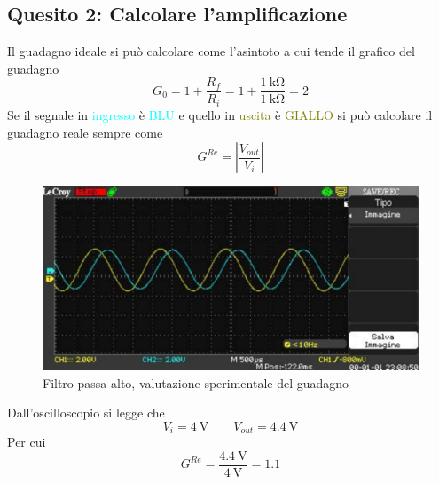 \documentclass[a4paper, 12pt, twoside]{report}
\begin{document}
	\newpage
	
	\subsection{Quesito 2: Calcolare l'amplificazione}
	Il guadagno ideale si può calcolare come l'asintoto a cui tende il grafico del guadagno
	\[G_0 = 1 + \dfrac{R_f}{R_i} = 1 + \dfrac{\SI{1}{\kilo\ohm}}{\SI{1}{\kilo\ohm}} = 2\]	
	Se il segnale in \textcolor{cyan}{ingresso} è \textcolor{cyan}{BLU} e quello in \textcolor{olive}{uscita} è \textcolor{olive}{GIALLO} si può calcolare il guadagno reale sempre come
	\[G^{Re} = \left|\dfrac{V_{out}}{V_i}\right| \] 
	
\begin{figure}[H]
	\centering
	\includegraphics[width=0.7\linewidth]{imag/WA000018}
	\caption{Filtro passa-alto, valutazione sperimentale del guadagno}
	\label{fig:wa000018}
\end{figure}

Dall'oscilloscopio si legge che 
\[V_i = \SI{4}{\volt} \qquad V_{out} = \SI{4.4}{\volt}\]
Per cui 
\[G^{Re} = \dfrac{\SI{4.4}{\volt}}{\SI{4}{\volt}} = 1.1\]

\newpage
\end{document}
